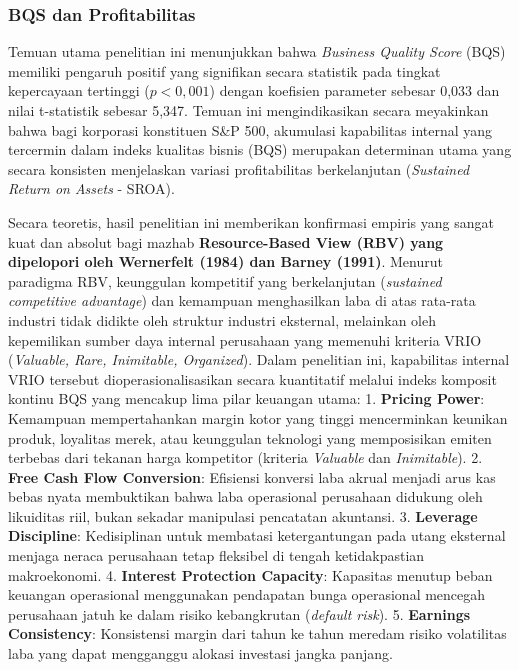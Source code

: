 \documentclass[12pt,a4paper]{article}
\begin{document}
\subsubsection{BQS dan Profitabilitas}\label{bqs-dan-profitabilitas}

Temuan utama penelitian ini menunjukkan bahwa \emph{Business Quality
Score} (BQS) memiliki pengaruh positif yang signifikan secara statistik
pada tingkat kepercayaan tertinggi (\(p < 0,001\)) dengan koefisien
parameter sebesar 0,033 dan nilai t-statistik sebesar 5,347. Temuan ini
mengindikasikan secara meyakinkan bahwa bagi korporasi konstituen S\&P
500, akumulasi kapabilitas internal yang tercermin dalam indeks kualitas
bisnis (BQS) merupakan determinan utama yang secara konsisten
menjelaskan variasi profitabilitas berkelanjutan (\emph{Sustained Return
on Assets} - SROA).

Secara teoretis, hasil penelitian ini memberikan konfirmasi empiris yang
sangat kuat dan absolut bagi mazhab \textbf{Resource-Based View (RBV)
yang dipelopori oleh Wernerfelt (1984) dan Barney (1991)}. Menurut
paradigma RBV, keunggulan kompetitif yang berkelanjutan (\emph{sustained
competitive advantage}) dan kemampuan menghasilkan laba di atas
rata-rata industri tidak didikte oleh struktur industri eksternal,
melainkan oleh kepemilikan sumber daya internal perusahaan yang memenuhi
kriteria VRIO (\emph{Valuable, Rare, Inimitable, Organized}). Dalam
penelitian ini, kapabilitas internal VRIO tersebut dioperasionalisasikan
secara kuantitatif melalui indeks komposit kontinu BQS yang mencakup
lima pilar keuangan utama: 1. \textbf{Pricing Power}: Kemampuan
mempertahankan margin kotor yang tinggi mencerminkan keunikan produk,
loyalitas merek, atau keunggulan teknologi yang memposisikan emiten
terbebas dari tekanan harga kompetitor (kriteria \emph{Valuable} dan
\emph{Inimitable}). 2. \textbf{Free Cash Flow Conversion}: Efisiensi
konversi laba akrual menjadi arus kas bebas nyata membuktikan bahwa laba
operasional perusahaan didukung oleh likuiditas riil, bukan sekadar
manipulasi pencatatan akuntansi. 3. \textbf{Leverage Discipline}:
Kedisiplinan untuk membatasi ketergantungan pada utang eksternal menjaga
neraca perusahaan tetap fleksibel di tengah ketidakpastian makroekonomi.
4. \textbf{Interest Protection Capacity}: Kapasitas menutup beban
keuangan operasional menggunakan pendapatan bunga operasional mencegah
perusahaan jatuh ke dalam risiko kebangkrutan (\emph{default risk}). 5.
\textbf{Earnings Consistency}: Konsistensi margin dari tahun ke tahun
meredam risiko volatilitas laba yang dapat mengganggu alokasi investasi
jangka panjang.
\end{document}

